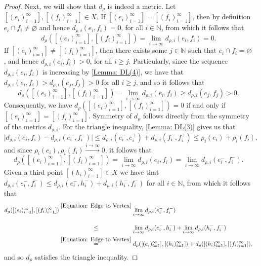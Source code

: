 \documentclass{amsart}
\numberwithin{equation}{section}
\theoremstyle{definition}
\theoremstyle{remark}
\newcommand{\N}{\mathbb{N}}
\begin{document}
\begin{proof}
    Next, we will show that \(d_\rho\) is indeed a metric. Let \([(e_i)_{i=1}^\infty],[(f_i)_{i=1}^\infty]\in X\). If \([(e_i)_{i=1}^\infty]=[(f_i)_{i=1}^\infty]\), then by definition \(e_i\cap f_i\neq \varnothing\) and hence \(d_{\rho,i}(e_i,f_i)=0\), for all \(i\in \N\), from which it follows that
        \[
            d_{\rho}([(e_i)_{i=1}^\infty],[(f_i)_{i=1}^\infty])=\lim_{i\to \infty}d_{\rho,i}(e_i,f_i)=0.
        \]
     If \([(e_i)_{i=1}^\infty]\neq[(f_i)_{i=1}^\infty]\), then there exists some \(j\in \N\) such that \(e_i\cap f_i=\varnothing\), and hence \(d_{\rho,i}(e_i,f_i)>0\), for all \(i\geq j\). Particularly, since the sequence \(d_{\rho,i}(e_i,f_i)\) is increasing by \ref{Lemma: DL(4)}, we have that \(d_{\rho,i}(e_i,f_i)>d_{\rho,i}(e_j,f_j)>0\) for all \(i\geq j\), and so it follows that
        \[
            d_{\rho}([(e_i)_{i=1}^\infty],[(f_i)_{i=1}^\infty])=\lim_{i\to \infty}d_{\rho,i}(e_i,f_i)\geq d_{\rho,i}(e_j,f_j)>0.
        \]
    Consequently, we have \(d_{\rho}([(e_i)_{i=1}^\infty],[(f_i)_{i=1}^\infty])=0\) if and only if \([(e_i)_{i=1}^\infty]=[(f_i)_{i=1}^\infty]\). Symmetry of \(d_\rho\) follows directly from the symmetry of the metrics \(d_{\rho,i}\). For the triangle inequality, \ref{Lemma: DL(3)} gives us that
        \[
            \lvert d_{\rho,i}(e_i,f_i)- d_{\rho,i}(e_i^-,f_i^-)\rvert\leq d_{\rho,i}(e_i^-,e_i^+)+d_{\rho,i}(f_i^-,f_i^+)\leq \rho_i(e_i)+\rho_i(f_i),
        \]
    and since \(\rho_i(e_i),\rho_i(f_i)\stackrel{i\to \infty}{\longrightarrow}0\), it follows that 
        \begin{equation}\label{Equation: Edge to Vertex}
            d_{\rho}([(e_i)_{i=1}^\infty],[(f_i)_{i=1}^\infty])=\lim_{i\to\infty}d_{\rho,i}(e_i,f_i)=\lim_{i\to\infty}d_{\rho,i}(e_i^-,f_i^-).
        \end{equation}
    Given a third point \([(h_i)_{i=1}^\infty]\in X\) we have that \(d_{\rho,i}(e_i^-,f_i^-)\leq d_{\rho,i}(e_i^-,h_i^-) + d_{\rho,i}(h_i^-,f_i^-)\) for all \(i\in \N\), from which it follows that
        \[
        \begin{split}
            d_\rho([(e_i)_{i=1}^\infty],[(f_i)_{i=1}^\infty])&\stackrel{\eqref{Equation: Edge to Vertex}}{=}\lim_{i\to\infty}d_{\rho,i}(e_i^-,f_i^-)\\
            &\stackrel{\phantom{\eqref{Equation: Edge to Vertex}}}{\leq} \lim_{i\to\infty} d_{\rho,i}(e_i^-,h_i^-)+\lim_{i\to\infty}d_{\rho,i}(h_i^-,f_i^-)\\
            &\stackrel{\eqref{Equation: Edge to Vertex}}{=}d_\rho([(e_i)_{i=1}^\infty],[(h_i)_{i=1}^\infty])+d_\rho([(h_i)_{i=1}^\infty],[(f_i)_{i=1}^\infty]),
        \end{split}
        \]
    and so \(d_\rho\) satisfies the triangle inequality.
\end{proof}
\end{document}
